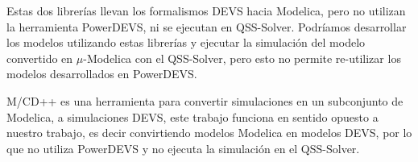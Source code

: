 Estas dos librerías llevan los formalismos DEVS hacia Modelica, pero no utilizan la herramienta PowerDEVS, ni se ejecutan en QSS-Solver.
Podríamos desarrollar los modelos utilizando estas librerías y ejecutar la simulación del modelo convertido en $\mu$-Modelica con el QSS-Solver, pero esto no permite re-utilizar los modelos desarrollados en PowerDEVS.


M/CD++ \cite{conf/mascots/DAbreuW05} es una herramienta para convertir simulaciones en un subconjunto de Modelica, a simulaciones DEVS, este trabajo funciona en sentido opuesto a nuestro trabajo, es decir convirtiendo modelos Modelica en modelos DEVS, por lo que no utiliza PowerDEVS y no ejecuta la simulación en el QSS-Solver\cite{Ber12}.


